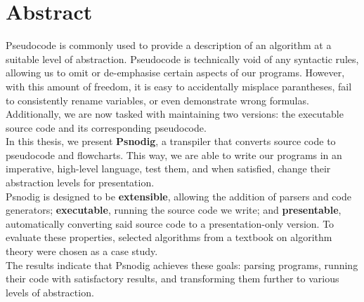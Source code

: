 \chapter*{Abstract}

Pseudocode is commonly used to provide a description of an algorithm at a suitable level of abstraction. Pseudocode is technically void of any syntactic rules, allowing us to omit or de-emphasise certain aspects of our programs. However, with this amount of freedom, it is easy to accidentally misplace parantheses, fail to consistently rename variables, or even demonstrate wrong formulas. Additionally, we are now tasked with maintaining two versions: the executable source code and its corresponding pseudocode. \\

In this thesis, we present \textbf{Psnodig}, a transpiler that converts source code to pseudocode and flowcharts. This way, we are able to write our programs in an imperative, high-level language, test them, and when satisfied, change their abstraction levels for presentation. \\

Psnodig is designed to be \textbf{extensible}, allowing the addition of parsers and code generators; \textbf{executable}, running the source code we write; and \textbf{presentable}, automatically converting said source code to a presentation-only version. To evaluate these properties, selected algorithms from a textbook on algorithm theory were chosen as a case study. \\

The results indicate that Psnodig achieves these goals: parsing programs, running their code with satisfactory results, and transforming them further to various levels of abstraction.